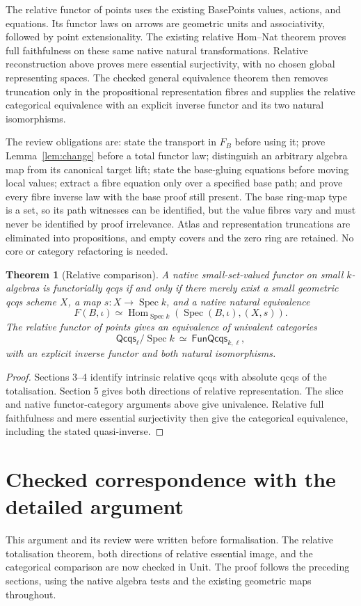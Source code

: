 \documentclass[11pt]{amsart}
\newtheorem{theorem}{Theorem}[section]
\theoremstyle{definition}\newtheorem{definition}[theorem]{Definition}
\newcommand{\Hom}{\operatorname{Hom}}
\newcommand{\Spec}{\operatorname{Spec}}
\begin{document}
The relative functor of points uses the existing BasePoints values,
actions, and equations. Its functor laws on arrows are geometric units
and associativity, followed by point extensionality. The existing
relative Hom--Nat theorem proves full faithfulness on these same native
natural transformations. Relative reconstruction above proves mere
essential surjectivity, with no chosen global representing spaces.
The checked general equivalence theorem then removes truncation only
in the propositional representation fibres and supplies the relative
categorical equivalence with an explicit inverse functor and its two
natural isomorphisms.

The review obligations are: state the transport in $F_B$ before using
it; prove Lemma~\ref{lem:change} before a total functor law; distinguish
an arbitrary algebra map from its canonical target lift; state the
base-gluing equations before moving local values; extract a fibre
equation only over a specified base path; and prove every fibre inverse
law with the base proof still present. The base ring-map type is a set,
so its path witnesses can be identified, but the value fibres vary and
must never be identified by proof irrelevance. Atlas and representation
truncations are eliminated into propositions, and empty covers and the
zero ring are retained. No core or category refactoring is needed.

\begin{theorem}[Relative comparison]
A native small-set-valued functor on small $k$-algebras is functorially
qcqs if and only if there merely exist a small geometric qcqs scheme
$X$, a map $s:X\to\Spec k$, and a native natural equivalence
\[
 F(B,\iota)\simeq
 \Hom_{\Spec k}(\Spec(B,\iota),(X,s)).
\]
The relative functor of points gives an equivalence of univalent
categories
\[
 \mathsf{Qcqs}_\ell/\Spec k\ \simeq\ \mathsf{FunQcqs}_{k,\ell},
\]
with an explicit inverse functor and both natural isomorphisms.
\end{theorem}
\begin{proof}
Sections 3--4 identify intrinsic relative qcqs with absolute qcqs of the
totalisation. Section 5 gives both directions of relative representation.
The slice and native functor-category arguments above give univalence.
Relative full faithfulness and mere essential surjectivity then give
the categorical equivalence, including the stated quasi-inverse.
\end{proof}

\section{Checked correspondence with the detailed argument}
This argument and its review were written before formalisation. The
relative totalisation theorem, both directions of relative essential
image, and the categorical comparison are now checked in Unit. The
proof follows the preceding sections, using the native algebra tests
and the existing geometric maps throughout.
\end{document}
